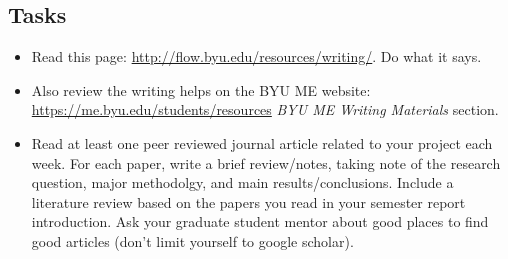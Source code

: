 \documentclass[]{article}%
\begin{document}
\subsection{Tasks}
\begin{itemize}
	\item Read this page: \url{http://flow.byu.edu/resources/writing/}. Do what it says.
	\item Also review the writing helps on the BYU ME website: \url{https://me.byu.edu/students/resources} \textit{BYU ME Writing Materials} section.
	\item Read at least one peer reviewed journal article related to your project each week. For each paper, write a brief review/notes, taking note of the research question, major methodolgy, and main results/conclusions. Include a literature review based on the papers you read in your semester report introduction.  Ask your graduate student mentor about good places to find good articles (don't limit yourself to google scholar).
\end{itemize}
\end{document}
